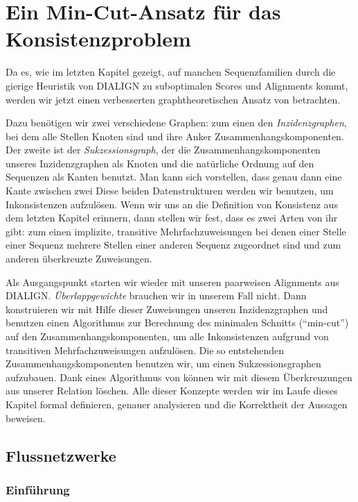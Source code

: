 \chapter{Ein Min-Cut-Ansatz für das Konsistenzproblem}
\label{ch:min-cut}
Da es, wie im letzten Kapitel gezeigt, auf manchen Sequenzfamilien durch die gierige Heuristik von DIALIGN zu suboptimalen Scores und Alignments kommt, werden wir jetzt einen verbesserten graphtheoretischen Ansatz von \cite{cpm10} betrachten.

Dazu benötigen wir zwei verschiedene Graphen: zum einen den \emph{Inzidenzgraphen}, bei dem alle Stellen Knoten sind und ihre Anker Zusammenhangskomponenten. Der zweite ist der \emph{Sukzessionsgraph}, der die Zusammenhangskomponenten unseres Inzidenzgraphen als Knoten und die natürliche Ordnung auf den Sequenzen als Kanten benutzt. Man kann sich vorstellen, dass genau dann eine Kante zwischen zwei  Diese beiden Datenstrukturen werden wir benutzen, um Inkonsistenzen aufzulösen. Wenn wir uns an die Definition von Konsistenz aus dem letzten Kapitel erinnern, dann stellen wir fest, dass es zwei Arten von ihr gibt: zum einen implizite, transitive Mehrfachzuweisungen bei denen einer Stelle einer Sequenz mehrere Stellen einer anderen Sequenz zugeordnet sind und zum anderen überkreuzte Zuweisungen.

Als Ausgangspunkt starten wir wieder mit unseren paarweisen Alignments aus DIALIGN. \emph{Überlappgewichte} brauchen wir in unserem Fall nicht. Dann konstruieren wir mit Hilfe dieser Zuweisungen unseren Inzidenzgraphen und benutzen einen Algorithmus zur Berechnung des minimalen Schnitts (\enquote{min-cut}) auf den Zusammenhangskomponenten, um alle Inkonsistenzen aufgrund von transitiven Mehrfachzuweisungen aufzulösen. Die so entstehenden Zusammenhangskomponenten benutzen wir, um einen Sukzessionsgraphen aufzubauen. Dank eines Algorithmus von \cite{pdc10} können wir mit diesem Überkreuzungen aus unserer Relation löschen. Alle dieser Konzepte werden wir im Laufe dieses Kapitel formal definieren, genauer analysieren und die Korrektheit der Aussagen beweisen.
 
\section{Flussnetzwerke}

\subsection{Einführung}

